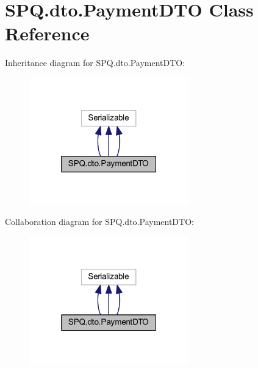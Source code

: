 \hypertarget{class_s_p_q_1_1dto_1_1_payment_d_t_o}{}\section{S\+P\+Q.\+dto.\+Payment\+D\+TO Class Reference}
\label{class_s_p_q_1_1dto_1_1_payment_d_t_o}


Inheritance diagram for S\+P\+Q.\+dto.\+Payment\+D\+TO\+:
\nopagebreak
\begin{figure}[H]
\begin{center}
\leavevmode
\includegraphics[width=196pt]{class_s_p_q_1_1dto_1_1_payment_d_t_o__inherit__graph}
\end{center}
\end{figure}


Collaboration diagram for S\+P\+Q.\+dto.\+Payment\+D\+TO\+:
\nopagebreak
\begin{figure}[H]
\begin{center}
\leavevmode
\includegraphics[width=196pt]{class_s_p_q_1_1dto_1_1_payment_d_t_o__coll__graph}
\end{center}
\end{figure}
